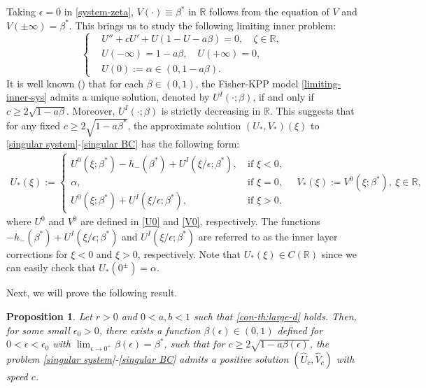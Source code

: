 \documentclass[11pt,a4paper]{article}
\newtheorem{proposition}[theorem]{\textbf{Proposition}}
\numberwithin{equation}{section}
\numberwithin{figure}{section}
\newcommand\bea{\begin{eqnarray}}
\newcommand\eea{\end{eqnarray}}
\newcommand\beaa{\begin{eqnarray*}}
\newcommand\eeaa{\end{eqnarray*}}
\begin{document}
Taking $\epsilon=0$ in \eqref{system-zeta}, $V(\cdot)\equiv \beta^*$ in $\mathbb{R}$ follows from the equation of $V$ and $V(\pm\infty)=\beta^*$. This brings us to study the following limiting inner problem:
 \begin{equation}\label{limiting-inner-sys}
\left\{
\begin{aligned}
&U''+cU'+U(1-U-a\beta)=0,\quad \zeta\in\mathbb{R},\\
&U(-\infty)=1-a\beta,\quad U(+\infty)=0,\\
&U(0):=\alpha\in(0,1-a\beta).
\end{aligned}
\right.
\end{equation}
It is well known (\cite{KPP}) that for each $\beta\in(0,1)$, the Fisher-KPP model \eqref{limiting-inner-sys} admits a unique solution, denoted by $U^I(\cdot;\beta)$,
if and only if $c\geq 2\sqrt{1-a\beta}$. Moreover, $U^I(\cdot;\beta)$ is strictly decreasing in $\mathbb{R}$.
This suggests that for any fixed $c\geq 2\sqrt{1-a\beta^*}$, the approximate solution $(U_*,V_*)(\xi)$
to \eqref{singular system}-\eqref{singular BC} has the following form:
\beaa
U_*(\xi):=
\begin{cases}
U^0(\xi;\beta^*)-h_-(\beta^*)+U^I(\xi/\epsilon;\beta^*),&\ \mbox{if $\xi<0$,}\\
\alpha,&\ \mbox{if $\xi=0$},\\
U^0(\xi;\beta^*)+U^I(\xi/\epsilon;\beta^*),&\ \mbox{if $\xi>0$,}
\end{cases}
\quad
V_*(\xi):=V^0(\xi;\beta^*),\ \xi\in\mathbb{R},
\eeaa
where $U^0$ and  $V^0$ are defined in \eqref{U0} and \eqref{V0}, respectively.
The functions $-h_{-}(\beta^*)+U^I(\xi/\epsilon;\beta^*)$ and $U^I(\xi/\epsilon;\beta^*)$ are referred to as the inner layer corrections for $\xi<0$ and $\xi>0$, respectively. Note that $U_*(\xi)\in C(\mathbb{R})$ since we can easily check that $U_*(0^\pm)=\alpha$.



Next, we will prove the following result.

\begin{proposition}\label{prop: approximation}
Let $r>0$ and $0<a,b<1$ such that \eqref{con-th:large-d} holds. Then, for some small $\epsilon_0>0$, there exists a
function $\beta(\epsilon)\in(0,1)$ defined for $0<\epsilon<\epsilon_0$ with $\lim_{\epsilon\to0^+}\beta(\epsilon)=\beta^*$,
such that for $c\geq 2\sqrt{1-a\beta(\epsilon)}$,
the problem \eqref{singular system}-\eqref{singular BC} admits a positive solution $(\hat{U}_c,\hat{V}_c)$ with speed $c$. %
\end{proposition}
\end{document}
